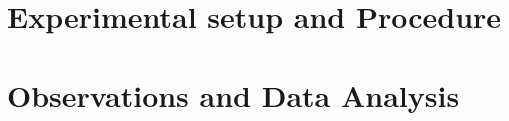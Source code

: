 \documentclass{article}
\begin{document}
\begin{multicols}{2}
\section{Experimental setup and Procedure}
\section{Observations and Data Analysis}

\end{multicols}
\end{document}
